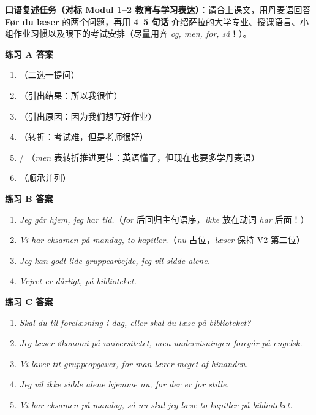 
\textbf{口语复述任务（对标 Modul 1--2 教育与学习表达）}：请合上课文，用丹麦语回答 \textbf{Før du læser} 的两个问题，再用 \textbf{4--5 句话} 介绍萨拉的大学专业、授课语言、小组作业习惯以及眼下的考试安排（尽量用齐 \textit{og, men, for, så}！）。

\begin{answerbox}
\textbf{练习 A 答案}
\begin{enumerate}
  \item {}（二选一提问）
  \item {}（引出结果：所以我很忙）
  \item {}（引出原因：因为我们想写好作业）
  \item {}（转折：考试难，但是老师很好）
  \item {} / （\textit{men} 表转折推进更佳：英语懂了，但现在也要多学丹麦语）
  \item {}（顺承并列）
\end{enumerate}

\textbf{练习 B 答案}
\begin{enumerate}
  \item \textit{Jeg går hjem,  jeg har  tid.}（\textit{for} 后回归主句语序，\textit{ikke} 放在动词 \textit{har} 后面！）
  \item \textit{Vi har eksamen på mandag,  to kapitler.}（\textit{nu} 占位，\textit{læser} 保持 V2 第二位）
  \item \textit{Jeg kan godt lide gruppearbejde,  jeg vil  sidde alene.}
  \item \textit{Vejret er dårligt,  på biblioteket.}
\end{enumerate}

\textbf{练习 C 答案}
\begin{enumerate}
  \item \textit{Skal du til forelæsning i dag, eller skal du læse på biblioteket?}
  \item \textit{Jeg læser økonomi på universitetet, men undervisningen foregår på engelsk.}
  \item \textit{Vi laver tit gruppeopgaver, for man lærer meget af hinanden.}
  \item \textit{Jeg vil ikke sidde alene hjemme nu, for der er for stille.}
  \item \textit{Vi har eksamen på mandag, så nu skal jeg læse to kapitler på biblioteket.}
\end{enumerate}


\end{answerbox}
